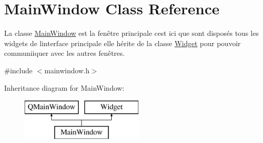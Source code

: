 \hypertarget{classMainWindow}{}\section{Main\+Window Class Reference}
\label{classMainWindow}


La classe \hyperlink{classMainWindow}{Main\+Window} est la fenêtre principale c\textquotesingle{}est ici que sont disposés tous les widgets de l\textquotesingle{}interface principale elle hérite de la classe \hyperlink{classWidget}{Widget} pour pouvoir communiiquer avec les autres fenêtres.  




{\ttfamily \#include $<$mainwindow.\+h$>$}

Inheritance diagram for Main\+Window\+:\begin{figure}[H]
\begin{center}
\leavevmode
\includegraphics[height=2.000000cm]{classMainWindow}
\end{center}
\end{figure}
